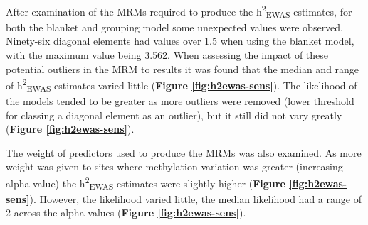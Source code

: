 \documentclass[11pt,oneside]{bristolthesis}
\begin{document}
After examination of the MRMs required to produce the h\textsuperscript{2}\textsubscript{EWAS} estimates, for both the blanket and grouping model some unexpected values were observed. Ninety-six diagonal elements had values over 1.5 when using the blanket model, with the maximum value being 3.562. When assessing the impact of these potential outliers in the MRM to results it was found that the median and range of h\textsuperscript{2}\textsubscript{EWAS} estimates varied little (\textbf{Figure \ref{fig:h2ewas-sens}}). The likelihood of the models tended to be greater as more outliers were removed (lower threshold for classing a diagonal element as an outlier), but it still did not vary greatly (\textbf{Figure \ref{fig:h2ewas-sens}}).

The weight of predictors used to produce the MRMs was also examined. As more weight was given to sites where methylation variation was greater (increasing alpha value) the h\textsuperscript{2}\textsubscript{EWAS} estimates were slightly higher (\textbf{Figure \ref{fig:h2ewas-sens}}). However, the likelihood varied little, the median likelihood had a range of 2 across the alpha values (\textbf{Figure \ref{fig:h2ewas-sens}}).
\end{document}
